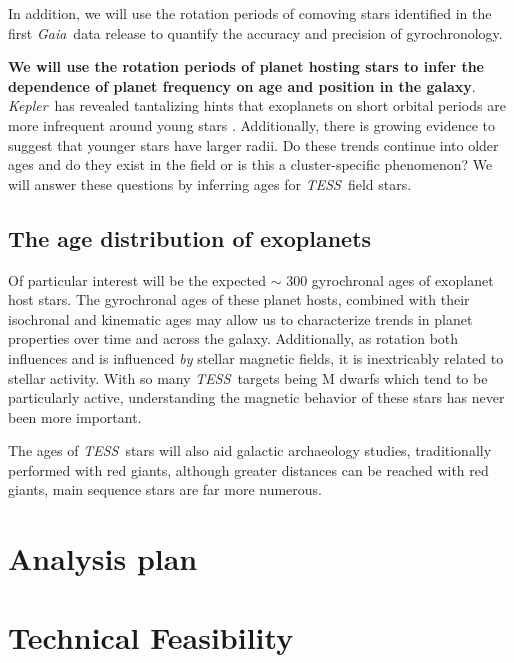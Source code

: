 \documentclass[useAMS, usenatbib, preprint, 12pt]{aastex}
\newcommand{\Kepler}{{\it Kepler}}
\newcommand{\kepler}{\Kepler}
\newcommand{\TESS}{{\it TESS}}
\newcommand{\Gaia}{{\it Gaia}}
\begin{document}
In addition, we will use the rotation periods of comoving stars identified in
the first \Gaia\ data release to quantify the accuracy and precision of
gyrochronology.

{\bf We will use the rotation periods of planet hosting stars to infer the
dependence of planet frequency on age and position in the galaxy}.
\kepler\ has revealed tantalizing hints that exoplanets on short orbital
periods are more infrequent around young stars \citep{mann2016a, mann2016b,
rizzuto2017}.
Additionally, there is growing evidence to suggest that younger stars have
larger radii.
Do these trends continue into older ages and do they exist in the field or is
this a cluster-specific phenomenon?
We will answer these questions by inferring ages for \TESS\ field stars.

\subsection{The age distribution of exoplanets}

Of particular interest will be the expected $\sim$ 300 gyrochronal ages of
exoplanet host stars.
The gyrochronal ages of these planet hosts, combined with their isochronal and
kinematic ages may allow us to characterize trends in planet properties over
time and across the galaxy.
Additionally, as rotation both influences and is influenced {\it by} stellar
magnetic fields, it is inextricably related to stellar activity.
With so many \TESS\ targets being M dwarfs which tend to be particularly
active, understanding the magnetic behavior of these stars has never been more
important.

The ages of \TESS\ stars will also aid galactic archaeology studies,
traditionally performed with red giants, although greater distances can be
reached with red giants, main sequence stars are far more numerous.

\section{Analysis plan}

\section{Technical Feasibility}
\end{document}

